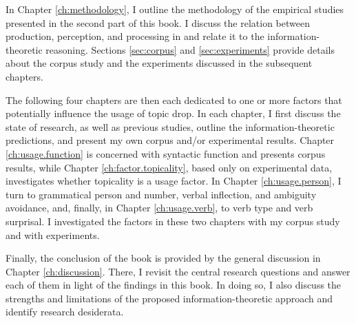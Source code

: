 In Chapter \ref{ch:methodology}, I outline the methodology of the empirical studies presented in the second part of this book.
I discuss the relation between production, perception, and processing in  and relate it to the information\hyp theoretic reasoning.
Sections \ref{sec:corpus} and \ref{sec:experiments} provide details about the corpus study and the experiments discussed in the subsequent chapters.

The following four chapters are then each dedicated to one or more factors that potentially influence the usage of topic drop.
In each chapter, I first discuss the state of research, as well as previous studies, outline the information\hyp theoretic predictions, and present my own corpus and/or experimental results.
Chapter \ref{ch:usage.function} is concerned with syntactic function and presents corpus results, while Chapter \ref{ch:factor.topicality}, based only on experimental data, investigates whether topicality is a usage factor.
In Chapter \ref{ch:usage.person}, I turn to grammatical person and number, verbal inflection, and ambiguity avoidance, and, finally, in Chapter \ref{ch:usage.verb}, to verb type and verb surprisal.
I investigated the factors in these two chapters with my corpus study and with experiments.

Finally, the conclusion of the book is provided by the general discussion in Chapter \ref{ch:discussion}.
There, I revisit the central research questions and answer each of them in light of the findings in this book.
In doing so, I also discuss the strengths and limitations of the proposed information\hyp theoretic approach and identify research desiderata.


